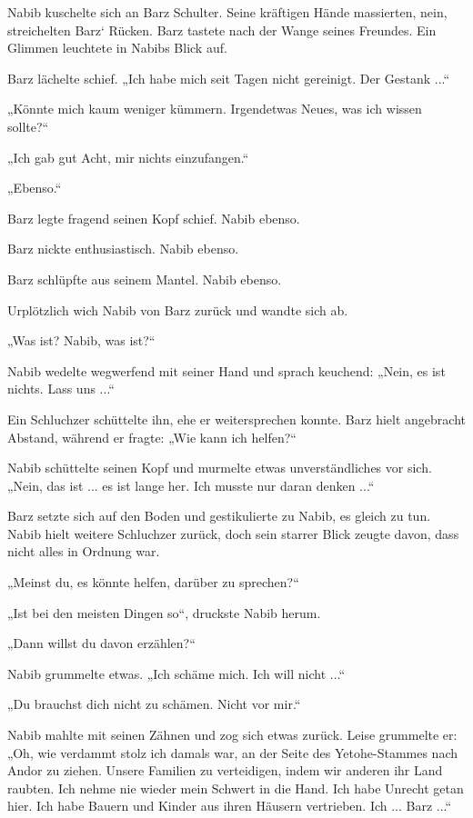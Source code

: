 Nabib kuschelte sich an Barz Schulter. Seine kräftigen Hände massierten, nein, streichelten Barz‘ Rücken. Barz tastete nach der Wange seines Freundes. Ein Glimmen leuchtete in Nabibs Blick auf.

Barz lächelte schief. „Ich habe mich seit Tagen nicht gereinigt. Der Gestank ...“

„Könnte mich kaum weniger kümmern. Irgendetwas Neues, was ich wissen sollte?“

„Ich gab gut Acht, mir nichts einzufangen.“

„Ebenso.“

Barz legte fragend seinen Kopf schief. Nabib ebenso.

Barz nickte enthusiastisch. Nabib ebenso.

Barz schlüpfte aus seinem Mantel. Nabib ebenso.



\trennzeichen



Urplötzlich wich Nabib von Barz zurück und wandte sich ab.

„Was ist? Nabib, was ist?“

Nabib wedelte wegwerfend mit seiner Hand und sprach keuchend: „Nein, es ist nichts. Lass uns ...“

Ein Schluchzer schüttelte ihn, ehe er weitersprechen konnte. Barz hielt angebracht Abstand, während er fragte: „Wie kann ich helfen?“

Nabib schüttelte seinen Kopf und murmelte etwas unverständliches vor sich. „Nein, das ist ... es ist lange her. Ich musste nur daran denken ...“

Barz setzte sich auf den Boden und gestikulierte zu Nabib, es gleich zu tun. Nabib hielt weitere Schluchzer zurück, doch sein starrer Blick zeugte davon, dass nicht alles in Ordnung war.

„Meinst du, es könnte helfen, darüber zu sprechen?“

„Ist bei den meisten Dingen so“, druckste Nabib herum.

„Dann willst du davon erzählen?“

Nabib grummelte etwas. „Ich schäme mich. Ich will nicht ...“

„Du brauchst dich nicht zu schämen. Nicht vor mir.“

Nabib mahlte mit seinen Zähnen und zog sich etwas zurück. Leise grummelte er: „Oh, wie verdammt stolz ich damals war, an der Seite des Yetohe-Stammes nach Andor zu ziehen. Unsere Familien zu verteidigen, indem wir anderen ihr Land raubten. Ich nehme nie wieder mein Schwert in die Hand. Ich habe Unrecht getan hier. Ich habe Bauern und Kinder aus ihren Häusern vertrieben. Ich ... Barz ...“

